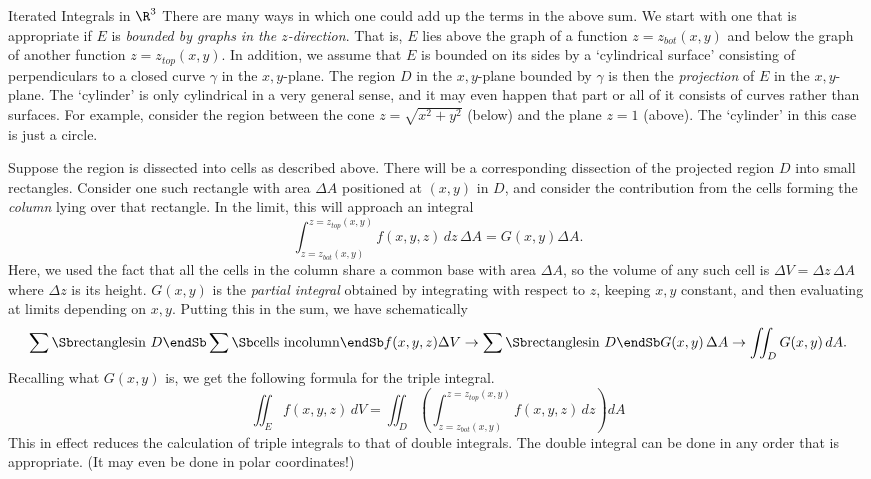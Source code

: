 \subhead Iterated Integrals in $\R^3$ \endsubhead
There are many ways in which one could add up the terms
in the above sum.  We start with one that is appropriate
if $E$ is {\it bounded by graphs in the $z$-direction}.
That is, $E$ lies above the graph of a function $z = z_{bot}(x,y)$
and below the graph of another function $z = z_{top}(x,y)$.
In addition, we assume that $E$ is bounded on its sides
by a `cylindrical surface' consisting of perpendiculars to
a  closed curve $\gamma$ in the $x,y$-plane.  The region
$D$ in the $x,y$-plane bounded by $\gamma$ is then the
{\it projection\/} of $E$ in the $x,y$-plane.  The
`cylinder' is only cylindrical in a very general sense,
and it may even happen that part or all of it consists of
curves rather than surfaces.  For example, consider the
region between the cone $z = \sqrt{x^2 + y^2}$ (below) and 
the plane $z = 1$ (above).  The `cylinder' in this case is
just a circle. 
\medskip
\centerline{}
\medskip
Suppose the region is dissected into cells as described
above.  There will be a corresponding
dissection of the projected region $D$ into small rectangles.
Consider one such rectangle with area $\Delta A$ positioned
at $(x,y)$ in $D$, and consider
the contribution from the cells forming the {\it column\/}
lying over that rectangle.  In the limit, this will approach
an integral
$$
      \int_{z = z_{bot}(x,y)}^{z = z_{top}(x,y)} f(x,y,z) \, dz\, \Delta A
= G(x,y)\Delta A.
$$
Here, we used the fact that all the cells in the column share a
common base with area $\Delta A$, so the volume of any such cell
is $\Delta V = \Delta z\,\Delta A$ where $\Delta z$ is its height.
$G(x,y)$ is the {\it partial integral\/} obtained by integrating
with respect to $z$, keeping $x, y$ constant, and then evaluating
at limits depending on $x,y$.
Putting this in the sum, we have schematically
$$
\sum\Sb\text{rectangles}\\ \text{in } D\endSb \sum\Sb\text{cells in}\\  
\text{column}\endSb f(x,y,z)\Delta V
\to 
\sum\Sb\text{rectangles}\\ \text{in } D\endSb G(x,y)\,\Delta A
\to \iint_D G(x,y) \,dA.
$$
Recalling what $G(x,y)$  is, we get the following formula
for the triple integral.
\nexteqn
\xdef\ZInt{\eqn}
$$
\iint_E f(x,y,z)\, dV =  
\iint_ D\left(\int_{z = z_{bot}(x,y)}^{z = z_{top}(x,y)} f(x,y,z) \, dz\right)
 dA 
$$
This in effect reduces the calculation of triple integrals to that
of double integrals.  The double integral can be done in any order
that is appropriate.  (It may even be done in polar coordinates!)

